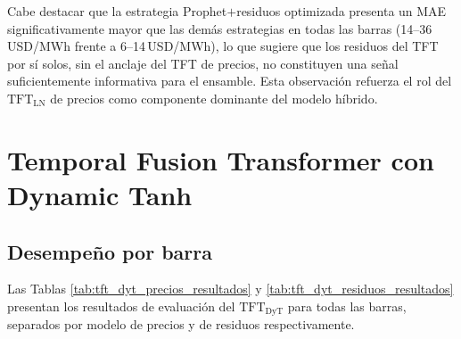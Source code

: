 Cabe destacar que la estrategia Prophet$+$residuos optimizada presenta un MAE significativamente mayor que las demás estrategias en todas las barras (14--36\,USD/MWh frente a 6--14\,USD/MWh), lo que sugiere que los residuos del TFT por sí solos, sin el anclaje del TFT de precios, no constituyen una señal suficientemente informativa para el ensamble. Esta observación refuerza el rol del $\text{TFT}_\text{LN}$ de precios como componente dominante del modelo híbrido.

\section{Temporal Fusion Transformer con Dynamic Tanh}

\subsection{Desempeño por barra}

Las Tablas \ref{tab:tft_dyt_precios_resultados} y \ref{tab:tft_dyt_residuos_resultados} presentan los resultados de evaluación del $\text{TFT}_\text{DyT}$ para todas las barras, separados por modelo de precios y de residuos respectivamente.

